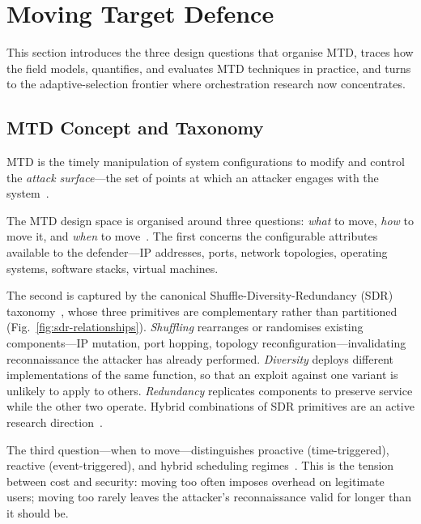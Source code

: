 
\section{Moving Target Defence}
\label{sec:mtd}

This section introduces the three design questions that organise MTD, traces how the field models, quantifies, and evaluates MTD techniques in practice, and turns to the adaptive-selection frontier where orchestration research now concentrates.



\subsection{MTD Concept and Taxonomy}
\label{subsec:mtd_concept}

MTD is the timely manipulation of system configurations to modify and control the \emph{attack surface}---the set of points at which an attacker engages with the system~\cite{cho2020}.

The MTD design space is organised around three questions: \emph{what} to move, \emph{how} to move it, and \emph{when} to move~\cite{cho2020}. The first concerns the configurable attributes available to the defender---IP addresses, ports, network topologies, operating systems, software stacks, virtual machines.

The second is captured by the canonical Shuffle-Diversity-Redundancy (SDR) taxonomy~\cite{cho2020}, whose three primitives are complementary rather than partitioned (Fig.~\ref{fig:sdr-relationships}). \emph{Shuffling} rearranges or randomises existing components---IP mutation, port hopping, topology reconfiguration---invalidating reconnaissance the attacker has already performed. \emph{Diversity} deploys different implementations of the same function, so that an exploit against one variant is unlikely to apply to others. \emph{Redundancy} replicates components to preserve service while the other two operate. Hybrid combinations of SDR primitives are an active research direction~\cite{cho2020}.

The third question---when to move---distinguishes proactive (time-triggered), reactive (event-triggered), and hybrid scheduling regimes~\cite{cho2020}. This is the tension between cost and security: moving too often imposes overhead on legitimate users; moving too rarely leaves the attacker's reconnaissance valid for longer than it should be.

